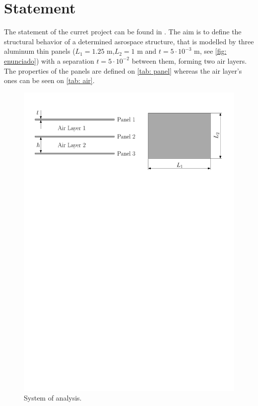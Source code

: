 \section{Statement} \label{sec: stat}

The statement of the curret project can be found in \cite{enunciado}. The aim is to define the structural behavior of a determined asrospace structure, that is modelled by three aluminum thin panels ($L_1=1.25$ m,$L_2=1$ m and $t=5\cdot 10^{-3}$ m, see \autoref{fig: enunciado}) with a separation $t = 5\cdot 10^{-2}$ between them, forming two air layers. The properties of the panels are defined on \autoref{tab: panel} whereas the air layer's ones  can be seen on \autoref{tab: air}.


\begin{figure}[htpb]
 \centering
    \includegraphics[scale=0.75]{Figures/enunciado.pdf}
  \caption{System of analysis.}
  \label{fig: enunciado}
\end{figure}

